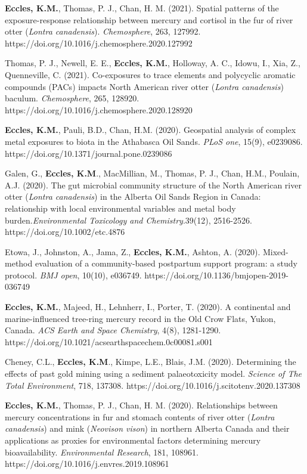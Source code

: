 \documentclass[margin,line]{res}
\begin{document}
\begin{resume}
\textbf{Eccles, K.M.}, Thomas, P. J., Chan, H. M. (2021). Spatial patterns of the exposure-response relationship between mercury and cortisol in the fur of river otter (\textit{Lontra canadensis}). \textit{Chemosphere}, 263, 127992. https://doi.org/10.1016/j.chemosphere.2020.127992

Thomas, P. J., Newell, E. E., \textbf{Eccles, K.M.}, Holloway, A. C., Idowu, I., Xia, Z., Quenneville, C. (2021). Co-exposures to trace elements and polycyclic aromatic compounds (PACs) impacts North American river otter (\textit{Lontra canadensis}) baculum. \textit{Chemosphere}, 265, 128920.\\https://doi.org/10.1016/j.chemosphere.2020.128920

\textbf{Eccles, K.M.}, Pauli, B.D., Chan, H.M. (2020). Geospatial analysis of complex metal exposures to biota in the Athabasca Oil Sands. \textit{PLoS one}, 15(9), e0239086. \\https://doi.org/10.1371/journal.pone.0239086

Galen, G., \textbf{Eccles, K.M}., MacMillian, M., Thomas, P. J., Chan, H.M., Poulain, A.J. (2020). The gut microbial community structure of the North American river otter (\textit{Lontra canadensis}) in the Alberta Oil Sands Region in Canada: relationship with local environmental variables and metal body burden.\textit{Environmental Toxicology and Chemistry}.39(12), 2516-2526. https://doi.org/10.1002/etc.4876

Etowa, J., Johnston, A., Jama, Z., \textbf{Eccles, K.M.}, Ashton, A. (2020). Mixed-method evaluation of a community-based postpartum support program: a study protocol. \textit{BMJ open}, 10(10), e036749. https://doi.org/10.1136/bmjopen-2019-036749

\textbf{Eccles, K.M.}, Majeed, H., Lehnherr, I., Porter, T. (2020). A continental and marine-influenced tree-ring mercury record in the Old Crow Flats, Yukon, Canada. \textit{ACS Earth and Space Chemistry}, 4(8), 1281-1290. https://doi.org/10.1021/acsearthspacechem.0c00081.s001

Cheney, C.L., \textbf{Eccles, K.M}., Kimpe, L.E., Blais, J.M. (2020). Determining the effects of past gold mining using a sediment palaeotoxicity model. \textit{Science of The Total Environment}, 718, 137308. https://doi.org/10.1016/j.scitotenv.2020.137308

\textbf{Eccles, K.M.}, Thomas, P. J., Chan, H. M. (2020). Relationships between mercury concentrations in fur and stomach contents of river otter (\textit{Lontra canadensis}) and mink (\textit{Neovison vison}) in northern Alberta Canada and their applications as proxies for environmental factors determining mercury bioavailability. \textit{Environmental Research}, 181, 108961. https://doi.org/10.1016/j.envres.2019.108961


\end{resume}
\end{document}
